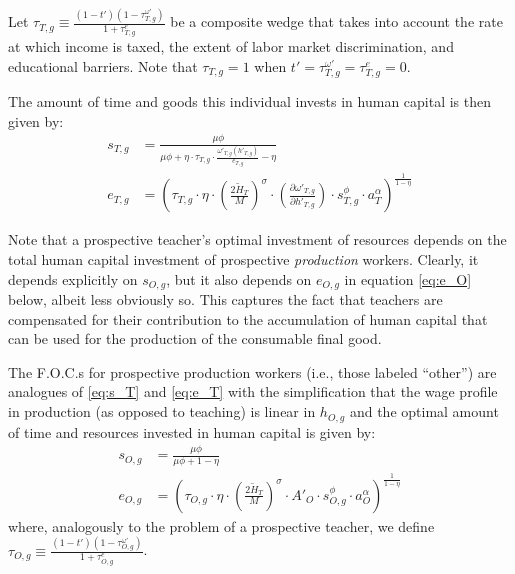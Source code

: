 \documentclass[onehalfspacing,11pt]{article}
\begin{document}
Let $\tau_{T,g} \equiv \frac{\left( 1-t' \right) \left( 1-\tau^{\omega '}_{T,g} \right)}{1+\tau^e_{T,g}}$ be a composite wedge that takes into account the rate at which income is taxed, the extent of labor market discrimination, and educational barriers. Note that $\tau_{T,g}=1$ when $t' = \tau^{\omega '}_{T,g} = \tau^e_{T,g} = 0$.

The amount of time and goods this individual invests in human capital is then given by:
\begin{align}
\label{eq:s_T}
s_{T,g} & = \frac{\mu \phi}{\mu \phi+\eta \cdot \tau_{T,g} \cdot \tfrac{\omega'_{T,g}(h'_{T,g})}{e_{T,g}}-\eta}\\
\label{eq:e_T}
e_{T,g} & = \left( \tau_{T,g}\cdot \eta \cdot\left(\tfrac{2 \widetilde{H}_T}{M}\right)^\sigma \cdot\left(\tfrac{\partial \omega'_{T,g}}{\partial h'_{T,g}}\right) \cdot s_{T,g}^\phi \cdot a_T^\alpha \right)^{\frac{1}{1-\eta}}
\end{align}

{\sc Note that a prospective teacher's optimal investment of resources depends on the total human capital investment of prospective {\it production} workers. Clearly, it depends explicitly on $s_{O,g}$, but it also depends on $e_{O,g}$ in equation \eqref{eq:e_O} below, albeit less obviously so. This captures the fact that teachers are compensated for their contribution to the accumulation of human capital that can be used for the production of the consumable final good.}%

The F.O.C.s for prospective production workers (i.e., those labeled ``other'') are analogues of \eqref{eq:s_T} and \eqref{eq:e_T} with the simplification that the wage profile in production (as opposed to teaching) is linear in $h_{O,g}$ and the optimal amount of time and resources invested in human capital is given by:
\begin{align}
s_{O,g} & = \frac{\mu \phi}{\mu \phi+1-\eta} \\
\label{eq:e_O}
e_{O,g} & = \left( \tau_{O,g} \cdot \eta \cdot \left(\tfrac{2\widetilde{H}_T}{M}\right)^\sigma\cdot {A'_{O}} \cdot s_{O,g}^\phi \cdot a_O^\alpha \right)^{\frac{1}{1-\eta}}
\end{align}
where, analogously to the problem of a prospective teacher, we define $\tau_{O,g} \equiv \frac{\left( 1-t' \right) \left( 1-\tau^{\omega '}_{O,g} \right)}{1+\tau^e_{O,g}}$.
\end{document}
